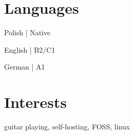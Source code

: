 \documentclass{article}
\newcommand\VRule{\color{lightgray}\vrule width 0.5pt}
\begin{document}


\section*{Languages}
\begin{minipage}[ht]{.3\textwidth}
\centering
Polish | Native
\end{minipage}
\begin{minipage}[ht]{.3\textwidth}
\centering
English | B2/C1
\end{minipage}
\begin{minipage}[ht]{.3\textwidth}
\centering
German | A1
\end{minipage}


\section*{Interests}
guitar playing, self-hosting, FOSS, linux
\end{document}
